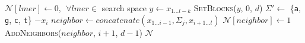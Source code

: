 \documentclass[oneside,12pt]{DISCSthesis}
\begin{document}
{{\begin{algorithmic}[1]
				\State $\mathcal{N}[lmer] \leftarrow 0,\ \ \forall lmer \in $ search space 
				\State $y \leftarrow x_{1...l-k}$ 
				\State \textsc{SetBlocks}($y$, 0, $d$) \hspace*{9pt}
				\EndFor
				\State {}
						\State $\Sigma' \leftarrow$ \{\texttt{a}, \texttt{g}, \texttt{c}, \texttt{t}\} $- x_{i}$ \hspace*{4pt}
							\State $neighbor \leftarrow concatenate(x_{1...i-1},\Sigma_{j},x_{i+1...l})$
							\State $\mathcal{N}[neighbor] \leftarrow 1$
								\State \textsc{AddNeighbors}($neighbor$, $i+1$, $d-1$)
							\EndIf
						\EndFor
					\EndFor
				\EndProcedure
				\State\Return $\mathcal{N}$
				\end{algorithmic}

			}\newpage



}
\end{document}
